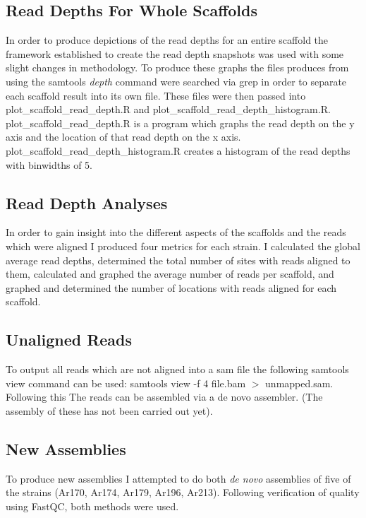 \documentclass[../main.tex]{subfiles}
\begin{document}
\subsection{Read Depths For Whole Scaffolds}
	In order to produce depictions of the read depths for an entire scaffold the framework established to create the read depth snapshots was used with some slight changes in methodology. To produce these graphs the files produces from using the samtools \textit{depth} command were searched via grep in order to separate each scaffold result into its own file. These files were then passed into plot\_scaffold\_read\_depth.R and plot\_scaffold\_read\_depth\_histogram.R. plot\_scaffold\_read\_depth.R is a program which graphs the read depth on the y axis and the location of that read depth on the x axis. plot\_scaffold\_read\_depth\_histogram.R creates a histogram of the read depths with binwidths of 5. %

\subsection{Read Depth Analyses}
	In order to gain insight into the different aspects of the scaffolds and the reads which were aligned I produced four metrics for each strain. I calculated the global average read depths, determined the total number of sites with reads aligned to them, calculated and graphed the average number of reads per scaffold, and graphed and determined the number of locations with reads aligned for each scaffold. 

\subsection{Unaligned Reads}
	To output all reads which are not aligned into a sam file the following samtools view command can be used: samtools view -f 4 file.bam $>$ unmapped.sam. Following this The reads can be assembled via a de novo assembler. (The assembly of these has not been carried out yet).

\subsection{New Assemblies}
	To produce new assemblies I attempted to do both \textit{de novo} assemblies of five of the strains (Ar170, Ar174, Ar179, Ar196, Ar213). Following verification of quality using FastQC, both methods were used.
\end{document}
